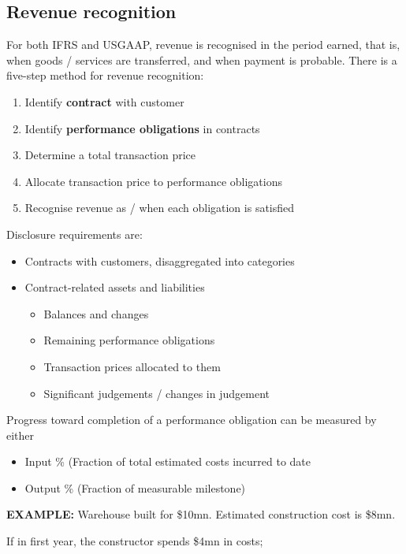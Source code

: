 \documentclass[../notes_compiled.tex]{subfiles}
\begin{document}
\subsection{Revenue recognition}
\begin{itemize}
\item For both IFRS and USGAAP, revenue is recognised in the period earned, that is, when goods / services are transferred, and when payment is probable. There is a five-step method for revenue recognition:
\begin{enumerate}
\item Identify \textbf{contract} with customer
\item Identify \textbf{performance obligations} in contracts
\item Determine a total transaction price
\item Allocate transaction price to performance obligations
\item Recognise revenue as / when each obligation is satisfied
\end{enumerate}
\item Disclosure requirements are:
\begin{itemize}
\item Contracts with customers, disaggregated into categories
\item Contract-related assets and liabilities
\begin{itemize}
\item Balances and changes
\item Remaining performance obligations
\item Transaction prices allocated to them
\item Significant judgements / changes in judgement
\end{itemize}
\end{itemize}
\item Progress toward completion of a performance obligation can be measured by either
\begin{itemize}
\item Input \% (Fraction of total estimated costs incurred to date
\item Output \% (Fraction of measurable milestone)
\end{itemize}
{\color{RedViolet}
\item[] \textbf{EXAMPLE:} Warehouse built for \$10mn. Estimated construction cost is \$8mn.
}
\begin{itemize}
{\color{RedViolet}
\item If in first year, the constructor spends \$4mn in costs;
}
\end{itemize}
\end{itemize}
\end{document}
